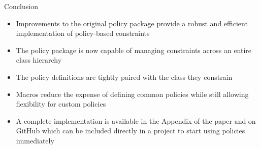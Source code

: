 \documentclass[aspectratio=169]{beamer}
\begin{document}
\begin{frame}
\end{frame}

\begin{frame}{Conclusion}
  \begin{itemize}
    \item Improvements to the original policy package provide a robust and efficient implementation of policy-based constraints
    \item The policy package is now capable of managing constraints across an entire class hierarchy
    \item The policy definitions are tightly paired with the class they constrain
    \item Macros reduce the expense of defining common policies while still allowing flexibility for custom policies
    \item A complete implementation is available in the Appendix of the paper and on GitHub\footnotemark\,\,which can be included directly in a project to start using policies immediately
  \end{itemize}
\end{frame}
\end{document}
